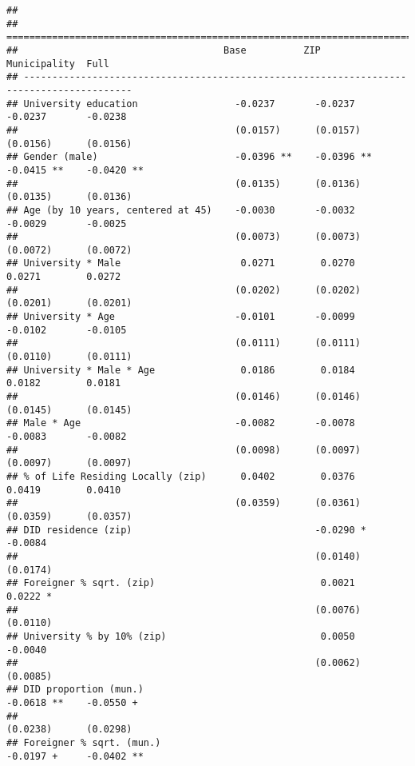 \documentclass[
]{article}
\begin{document}
\begin{verbatim}
## 
## =========================================================================================
##                                    Base          ZIP           Municipality  Full        
## -----------------------------------------------------------------------------------------
## University education                 -0.0237       -0.0237       -0.0237       -0.0238   
##                                      (0.0157)      (0.0157)      (0.0156)      (0.0156)  
## Gender (male)                        -0.0396 **    -0.0396 **    -0.0415 **    -0.0420 **
##                                      (0.0135)      (0.0136)      (0.0135)      (0.0136)  
## Age (by 10 years, centered at 45)    -0.0030       -0.0032       -0.0029       -0.0025   
##                                      (0.0073)      (0.0073)      (0.0072)      (0.0072)  
## University * Male                     0.0271        0.0270        0.0271        0.0272   
##                                      (0.0202)      (0.0202)      (0.0201)      (0.0201)  
## University * Age                     -0.0101       -0.0099       -0.0102       -0.0105   
##                                      (0.0111)      (0.0111)      (0.0110)      (0.0111)  
## University * Male * Age               0.0186        0.0184        0.0182        0.0181   
##                                      (0.0146)      (0.0146)      (0.0145)      (0.0145)  
## Male * Age                           -0.0082       -0.0078       -0.0083       -0.0082   
##                                      (0.0098)      (0.0097)      (0.0097)      (0.0097)  
## % of Life Residing Locally (zip)      0.0402        0.0376        0.0419        0.0410   
##                                      (0.0359)      (0.0361)      (0.0359)      (0.0357)  
## DID residence (zip)                                -0.0290 *                   -0.0084   
##                                                    (0.0140)                    (0.0174)  
## Foreigner % sqrt. (zip)                             0.0021                      0.0222 * 
##                                                    (0.0076)                    (0.0110)  
## University % by 10% (zip)                           0.0050                     -0.0040   
##                                                    (0.0062)                    (0.0085)  
## DID proportion (mun.)                                            -0.0618 **    -0.0550 + 
##                                                                  (0.0238)      (0.0298)  
## Foreigner % sqrt. (mun.)                                         -0.0197 +     -0.0402 **

\end{verbatim}
\end{document}
